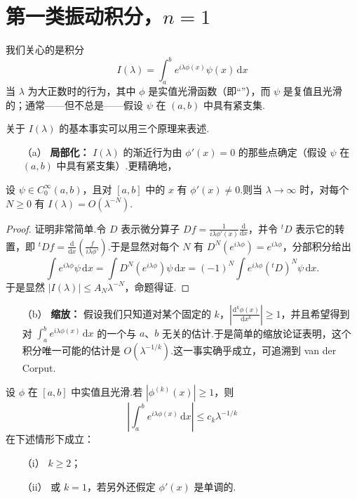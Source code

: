 \documentclass[
  BookTitleCN={傅里叶分析中的振动积分},
  BookTitleEN={Oscillatory Integrals in Fourier Analysis},
  OriginalAuthor={E.~M. Stein},
  OriginalEdition={Proc. Sympos. Pure Math. 35, Part~1},
  OriginalPublisher={American Mathematical Society},
  OriginalYear={1979},
  Translator={翻译及重排},
  ModelUsed={Codex CLI},
  Biblatex=false,
  TranslationDate={2026年8月27日}
]{mathtranslation}
\numberwithin{equation}{chapter}   %
\begin{document}
\chapter{第一类振动积分，\texorpdfstring{$n=1$}{n = 1}}

\noindent 我们关心的是积分
\[
  I(\lambda) = \int_{a}^{b} e^{i\lambda\phi(x)}\psi(x)\,\mathrm{d}x
\]
当 $\lambda$ 为大正数时的行为，其中 $\phi$ 是实值光滑函数（即``''），而 $\psi$ 是复值且光滑的；通常——但不总是——假设 $\psi$ 在 $(a,b)$ 中具有紧支集.

关于 $I(\lambda)$ 的基本事实可以用三个原理来表述.

\begin{enumerate}
  \item[（a）] \textbf{局部化：} $I(\lambda)$ 的渐近行为由 $\phi'(x)=0$ 的那些点确定（假设 $\psi$ 在 $(a,b)$ 中具有紧支集）.更精确地，
\end{enumerate}

\begin{proposition}\label{prop:1}
  设 $\psi\in C_0^\infty(a,b)$，且对 $[a,b]$ 中的 $x$ 有 $\phi'(x)\neq0$.则当 $\lambda\to\infty$ 时，对每个 $N\geq0$ 有 $I(\lambda)=O(\lambda^{-N})$.
\end{proposition}

\begin{proof}
  证明非常简单.令 $D$ 表示微分算子 $Df=\frac{1}{i\lambda\phi'(x)}\frac{\mathrm{d}}{\mathrm{d}x}$，并令 ${}^{t}\!D$ 表示它的转置，即 ${}^{t}\!Df=\frac{\mathrm{d}}{\mathrm{d}x}\left(\frac{f}{i\lambda\phi'}\right)$.于是显然对每个 $N$ 有 $D^{N}(e^{i\lambda\phi})=e^{i\lambda\phi}$，分部积分给出
  \[
    \int e^{i\lambda\phi}\psi\,\mathrm{d}x = \int D^{N}(e^{i\lambda\phi})\psi\,\mathrm{d}x = (-1)^{N}\int e^{i\lambda\phi}({}^{t}D)^{N}\psi\,\mathrm{d}x .
  \]
  于是显然 $|I(\lambda)|\leq A_{N}\lambda^{-N}$，命题得证.
\end{proof}

\begin{enumerate}
  \item[（b）] \textbf{缩放：} 假设我们只知道对某个固定的 $k$，$\left|\frac{\mathrm{d}^{k}\phi(x)}{\mathrm{d}x^{k}}\right|\geq1$，并且希望得到对 $\int_{a}^{b}e^{i\lambda\phi(x)}\,\mathrm{d}x$ 的一个与 $a$、$b$ 无关的估计.于是简单的缩放论证表明，这个积分唯一可能的估计是 $O(\lambda^{-1/k})$.这一事实确乎成立，可追溯到 van der Corput.
\end{enumerate}

\begin{proposition}\label{prop:2}
  设 $\phi$ 在 $[a,b]$ 中实值且光滑.若 $|\phi^{(k)}(x)|\geq1$，则
  \begin{equation}
    \left|\int_{a}^{b}e^{i\lambda\phi(x)}\,\mathrm{d}x\right|\leq c_{k}\lambda^{-1/k} \label{eq:1.1}
  \end{equation}
  在下述情形下成立：
  \begin{enumerate}
    \item[（i）] $k\geq2$；
    \item[（ii）] 或 $k=1$，若另外还假定 $\phi'(x)$ 是单调的.
  \end{enumerate}
\end{proposition}
\end{document}

